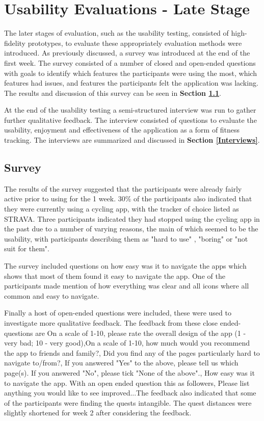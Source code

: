 \documentclass{l4proj}
\begin{document}
\section{Usability Evaluations - Late Stage}
The later stages of evaluation, such as the usability testing, consisted of high-fidelity prototypes, to evaluate these appropriately evaluation methods were introduced. As previously discussed, a survey was introduced at the end of the first week. The survey consisted of a number of closed and open-ended questions with goals to identify which features the participants were using the most,  which features had issues, and features the participants felt the application was lacking. The results and discussion of this survey can be seen in \textbf{Section \ref{resultssurvey}}.

At the end of the usability testing a semi-structured interview was run to gather further qualitative feedback. The interview consisted of questions to evaluate the usability, enjoyment and effectiveness of the application as a form of fitness tracking. The interviews are summarized and discussed in \textbf{Section \ref{Interviews}}.


\label{UsabilityEvaluationslaterstages}
\subsection{Survey}\label{resultssurvey}

The results of the survey suggested that the participants were already fairly active prior to using for the 1 week. 30\% of the participants also indicated that they were currently using a cycling app, with the tracker of choice listed as STRAVA. Three participants indicated they had stopped using the cycling app in the past due to a number of varying reasons, the main of which seemed to be the usability, with participants describing them as "hard to use" , "boring" or "not suit for them". 

The survey included questions on how easy was it to navigate the apps which shows that most of them found it easy to navigate the app. One of the participants made mention of how everything was clear and all icons where all common and easy to navigate.


Finally a host of open-ended questions were included, these were used to investigate more qualitative feedback. The feedback from these close ended-questions are On a scale of 1-10, please rate the overall design of the app (1 - very bad; 10 - very good),On a scale of 1-10, how much would you recommend the app to friends and family?, Did you find any of the pages particularly hard to navigate to/from?, If you answered "Yes" to the above, please tell us which page(s). If you answered "No", please tick "None of the above"., How easy was it to navigate the app. With an open ended question this as followers, Please list anything you would like to see improved...The feedback also indicated that some of the participants were finding the quests intangible. The quest distances were slightly shortened for week 2 after considering the feedback.
\end{document}

